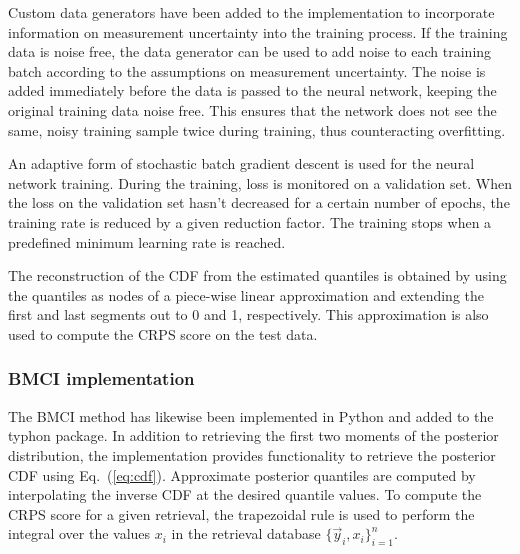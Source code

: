 \documentclass[journal abbreviation, manuscript]{copernicus}
\begin{document}
  Custom data generators have been added to the implementation  to incorporate
   information on measurement uncertainty into the training
  process. If the training data is noise free, the data generator can be used to
  add noise to each training batch according to the assumptions on measurement
  uncertainty. The noise is added immediately  before the data is passed to the
  neural network, keeping the original training data noise free. This ensures
  that the network does not see the same, noisy training sample twice during
  training, thus counteracting overfitting.


  An adaptive form of stochastic batch gradient descent is used for the neural
  network training. During the training, loss is monitored on a validation set.
  When the loss on the validation set hasn't decreased for a certain number of
  epochs, the training rate is reduced by a given reduction factor. The training
  stops when a predefined minimum learning rate is reached.

  The reconstruction of the CDF from the estimated quantiles is obtained
  by using the quantiles as nodes of a piece-wise linear approximation and
  extending the first and last segments out to 0 and 1, respectively.
  This approximation is also used to compute the CRPS score on the test
  data.


\subsubsection{BMCI implementation}
\label{sec:implementation_bmci}

 The BMCI method has likewise been implemented in Python and added to the
 typhon package. In addition to retrieving the first two moments of the
 posterior distribution, the implementation provides functionality to
 retrieve the posterior CDF using Eq.~(\ref{eq:cdf}). Approximate posterior
 quantiles are computed by interpolating the inverse CDF at the desired quantile
 values. To compute the CRPS score for a given retrieval, the trapezoidal rule
 is used to perform the integral over the values $x_i$ in the retrieval database
 $\{\vec{y}_i, x_i\}_{i = 1}^n$.
\end{document}
